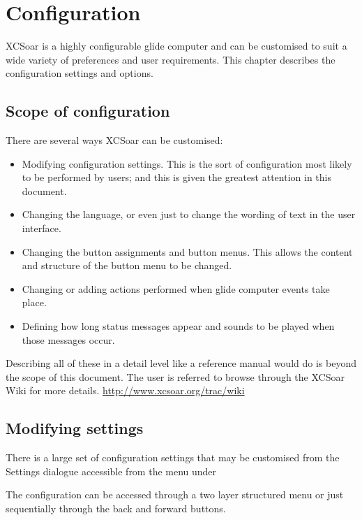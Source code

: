 \chapter{Configuration}\label{cha:configuration}
XCSoar is a highly configurable glide computer and can be customised
to suit a wide variety of preferences and user requirements.  This
chapter describes the configuration settings and options.

\section{Scope of configuration}

There are several ways XCSoar can be customised:
\begin{itemize}

\item Modifying configuration settings.  This is the sort of configuration
  most likely to be performed by users; and this is given the greatest attention 
  in this document.
\item Changing the language, or even just to change the wording
  of text in the user interface.
\item Changing the button assignments and button menus.  This allows 
  the content and structure of the button menu to be changed. 
\item Changing or adding actions performed when glide computer events
  take place.
\item Defining how long status messages appear and sounds to be played
  when those messages occur.
\end{itemize}
Describing all of these in a detail level like a reference manual would 
do is beyond the scope of this document. The user is referred to browse 
through the XCSoar Wiki for more details. 
\url{http://www.xcsoar.org/trac/wiki}

\section{Modifying settings}

There is a large set of configuration settings that may be customised
from the Settings dialogue accessible from the menu under
\begin{quote}
\blink{}\blink{}
\end{quote}
The configuration can be accessed through a two layer structured menu 
or just sequentially through the back and forward buttons.

